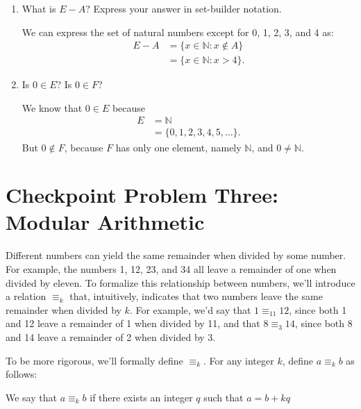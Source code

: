 \documentclass{article}
\renewcommand{\(}{\left(}
\renewcommand{\)}{\right)}
\theoremstyle{plain}
\theoremstyle{plain}
\theoremstyle{definition}
\begin{document}
\begin{enumerate}[label*=\roman*.,ref=\roman*]
\item What is $E - A$? Express your answer in set-builder notation.

\begin{shaded}
We can express the set of natural numbers except for 0, 1, 2, 3, and 4 as:
\begin{equation}
	\begin{aligned}
		E - A & = \{x \in \mathbb{N}: x \notin A\} \\
		& = \{x \in \mathbb{N}: x > 4 \}.
	\end{aligned}
\end{equation}
\end{shaded}

\item Is $0 \in E$? Is $0 \in F$?

\begin{shaded}
We know that $0 \in E$ because
\begin{equation}
	\begin{aligned}
	E & = \mathbb{N} \\
	& = \{0, 1, 2, 3, 4, 5, \ldots \}.
	\end{aligned}
\end{equation}
But $0 \notin F$, because $F$ has only one element, namely $\mathbb{N}$, and $0 \neq \mathbb{N}$.
\end{shaded}

\end{enumerate}

\section*{Checkpoint Problem Three: Modular Arithmetic}

Different numbers can yield the same remainder when divided by some number. For example, the numbers 1, 12, 23, and 34 all leave a remainder of one when divided by eleven. To formalize this relationship between numbers, we'll introduce a relation $\equiv_k$ that, intuitively, indicates that two numbers leave the same remainder when divided by $k$. For example, we'd say that $1 \equiv_{11} 12$, since both 1 and 12 leave a remainder of 1 when divided by 11, and that $8 \equiv_3 14$, since both 8 and 14 leave a remainder of 2 when
divided by 3. 

To be more rigorous, we'll formally define $\equiv_k$. For any integer $k$, define $a \equiv_k b$ as follows:
\begin{center}
    We say that $a \equiv_k b$ if there exists an integer $q$ such that $a = b + kq$
\end{center}
\end{document}

